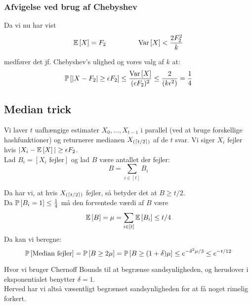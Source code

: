 \subsubsection{Afvigelse ved brug af Chebyshev}
Da vi nu har vist
$$
  \E{X} = F_2
  \longspace
  \Var{X} < \frac{2 F_2^2}{k}
$$

medfører det jf. Chebyshev's ulighed og vores valg af $k$ at:
$$
  \P{|X - F_2| \geq \epsilon F_2 }
  \leq \frac{\Var{X}}{(\epsilon F_2)^2}
  \leq \frac{2}{(k \epsilon^2)}
  = \frac{1}{4}
$$


\subsection{Median trick}
Vi laver $t$ uafhængige estimater $X_0, \dots, X_{t-1}$ i parallel (ved at bruge forskellige hashfunktioner) og returnerer medianen $X_{(\ceil{t/2})}$ af de $t$ svar. Vi siger $X_i$ fejler hvis $|X_i - \E{X}| \geq \epsilon F_2$.\\

Lad $B_i = [X_i \text{ fejler}]$ og lad $B$ være antallet der fejler:
$$
B = \sum_{i \in [t]} B_i
$$


Da har vi, at hvis $X_{(\ceil{t/2})}$ fejler, så betyder det at $B \geq t/2$.\\
Da $\P{B_i = 1} \leq \frac{1}{4}$ må den forventede værdi af $B$ være
$$
\E{B} = \mu = \sum_{i \in [t]} \E{B_i} \leq t/4
$$
Da kan vi beregne:
$$
\P{\text{Median fejler}}
= \P{B \geq 2 \mu}
= \P{B \geq (1 + \delta) \mu }
\leq e^{- \delta^2 \mu / 3}
\leq e^{-t/12}
$$

Hvor vi bruger Chernoff Bounds til at begrænse sandsynligheden, og herudover i eksponentialet benytter $\delta = 1$.\\

Herved har vi altså væsentligt begrænset sandsynligheden for at få noget rimelig forkert.





